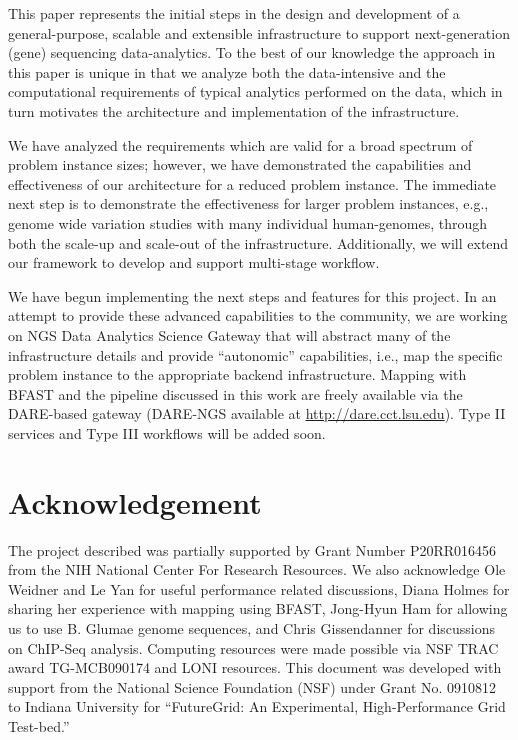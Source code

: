 \documentclass{cpeauth}
\begin{document}
This paper represents the initial steps in the design and development
of a general-purpose, scalable and extensible infrastructure to
support next-generation (gene) sequencing data-analytics. To the best
of our knowledge the approach in this paper is unique in that we
analyze both the data-intensive and the computational requirements of
typical analytics performed on the data, which in turn motivates the
architecture and implementation of the infrastructure. 

We have analyzed the requirements which are valid for a broad spectrum
of problem instance sizes; however, we have demonstrated the
capabilities and effectiveness of our architecture for a reduced
problem instance. The immediate next step is to demonstrate the
effectiveness for larger problem instances, e.g., genome wide
variation studies with many individual human-genomes, through both the
scale-up and scale-out of the infrastructure.  Additionally, we will
extend our framework to develop and support multi-stage workflow.

We have begun implementing the next steps and features for this
project. In an attempt to provide these advanced capabilities to the
community, we are working on NGS Data Analytics Science Gateway that
will abstract many of the infrastructure details and provide
``autonomic'' capabilities, i.e., map the specific problem instance to
the appropriate backend infrastructure.  Mapping with BFAST and the
pipeline discussed in this work are freely available via the
DARE-based gateway (DARE-NGS available at
\url{http://dare.cct.lsu.edu}). Type II services and Type III
workflows will be added soon.

\vspace{-0.5in}

\section*{Acknowledgement}

The project described was partially supported by Grant Number
P20RR016456 from the NIH National Center For Research Resources.  We
also acknowledge Ole Weidner and Le Yan for useful performance related
discussions, Diana Holmes for sharing her experience with mapping
using BFAST, Jong-Hyun Ham for allowing us to use B. Glumae genome
sequences, and Chris Gissendanner for discussions on ChIP-Seq
analysis.  Computing resources were made possible via NSF TRAC award
TG-MCB090174 and LONI resources.  This document was developed with
support from the National Science Foundation (NSF) under Grant No.
0910812 to Indiana University for ``FutureGrid: An Experimental,
High-Performance Grid Test-bed.''


 

\end{document}

